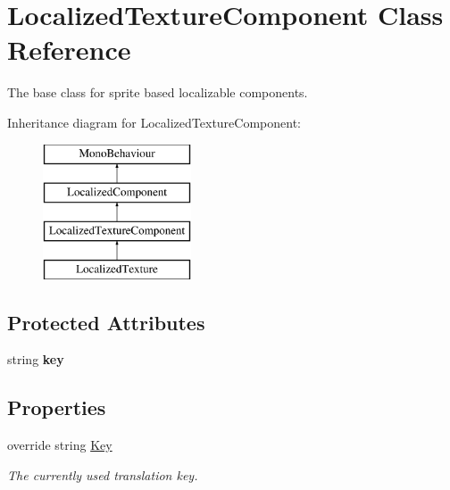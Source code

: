 \hypertarget{class_localized_texture_component}{}\section{Localized\+Texture\+Component Class Reference}
\label{class_localized_texture_component}


The base class for sprite based localizable components.  


Inheritance diagram for Localized\+Texture\+Component\+:\begin{figure}[H]
\begin{center}
\leavevmode
\includegraphics[height=4.000000cm]{class_localized_texture_component}
\end{center}
\end{figure}
\subsection*{Protected Attributes}
\begin{DoxyCompactItemize}
\item 
string {\bfseries key}\hypertarget{class_localized_texture_component_a3ee963bdac464bc2e98b457b6603aaf9}{}\label{class_localized_texture_component_a3ee963bdac464bc2e98b457b6603aaf9}

\end{DoxyCompactItemize}
\subsection*{Properties}
\begin{DoxyCompactItemize}
\item 
override string \hyperlink{class_localized_texture_component_acfd68f76863eed365ae745974ba6c04b}{Key}
\begin{DoxyCompactList}\small\item\em The currently used translation key. \end{DoxyCompactList}\end{DoxyCompactItemize}
